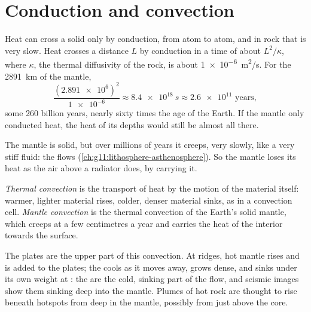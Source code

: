 \section{Conduction and convection}

Heat can cross a solid only by conduction, from atom to atom, and in rock
that is very slow. Heat crosses a distance $L$ by conduction in a time of
about $L^2/\kappa$, where $\kappa$, the thermal diffusivity of the rock, is
about \qty{1e-6}{m^2/s}. For the
\qty{2891}{km} of the mantle,
\[
  \frac{(\num{2.891e6})^2}{\num{1e-6}} \approx \qty{8.4e18}{s} \approx
  \num{2.6e11} \text{ years},
\]
some 260 billion years, nearly sixty times the age of the Earth. If the mantle
only conducted heat, the heat of its depths would still be almost all there.

The mantle is solid, but over millions of years it creeps, very slowly, like
a very stiff fluid: the  flows (\cref{ch:g11:lithosphere-asthenosphere}).
So the mantle loses its heat as the air above a radiator does, by carrying it.

\begin{definition}\label{def:g12:internal-heat:convection}
\emph{Thermal convection} is the transport of heat
by the motion of the material itself: warmer, lighter material rises,
colder, denser material sinks, as in a convection cell.
\emph{Mantle convection} is the thermal
convection of the Earth's solid mantle, which creeps at a few centimetres a
year and carries the heat of the interior towards the surface.
\end{definition}

The plates are the upper part of this convection. At ridges, hot mantle
rises and is added to the plates; the  cools as it moves away,
grows dense, and sinks under its own weight at : the 
are the cold, sinking part of the flow, and seismic images show them
sinking deep into the mantle. Plumes of hot rock are thought to rise beneath
hotspots from deep in the mantle, possibly from just above the core.

